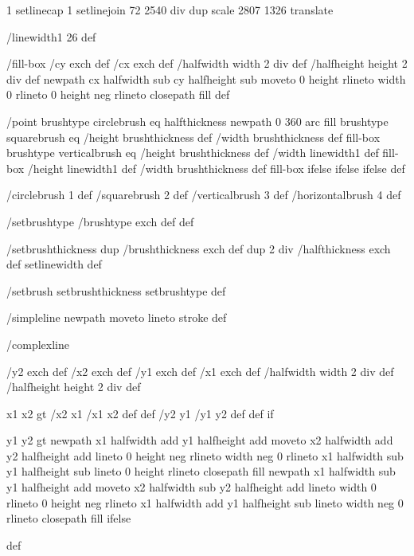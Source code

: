 1 setlinecap 1 setlinejoin
72 2540 div dup scale
2807 1326 translate



/linewidth1 26 def

/fill-box
  { /cy exch def /cx exch def
    /halfwidth width 2 div def
    /halfheight height 2 div def
    newpath
     cx halfwidth sub cy halfheight sub moveto
     0 height rlineto
     width 0 rlineto
     0 height neg rlineto
     closepath
     fill } def

/point
  { brushtype circlebrush eq
     { halfthickness newpath 0 360 arc fill }
     { brushtype squarebrush eq
        { /height brushthickness def
	  /width brushthickness def
	  fill-box }
        { brushtype verticalbrush eq
           { /height brushthickness def
	     /width linewidth1 def
	     fill-box }
           { /height linewidth1 def
	     /width brushthickness def
	     fill-box }
	   ifelse }
        ifelse }
     ifelse } def

/circlebrush     1 def
/squarebrush     2 def
/verticalbrush   3 def
/horizontalbrush 4 def

/setbrushtype { /brushtype exch def } def

/setbrushthickness
  { dup /brushthickness exch def
    dup 2 div /halfthickness exch def
    setlinewidth } def

/setbrush { setbrushthickness setbrushtype } def

/simpleline { newpath moveto lineto stroke } def

/complexline
  { /y2 exch def /x2 exch def
    /y1 exch def /x1 exch def
    /halfwidth width 2 div def
    /halfheight height 2 div def

    x1 x2 gt { /x2 x1 /x1 x2 def def /y2 y1 /y1 y2 def def } if

    y1 y2 gt
     { %
       newpath
        x1 halfwidth add y1 halfheight add moveto
	x2 halfwidth add y2 halfheight add lineto
	0 height neg rlineto
        width neg 0 rlineto
        x1 halfwidth sub y1 halfheight sub lineto
        0 height rlineto
        closepath
	fill }
     { %
       newpath
        x1 halfwidth sub y1 halfheight add moveto
	x2 halfwidth sub y2 halfheight add lineto
	width 0 rlineto
	0 height neg rlineto
	x1 halfwidth add y1 halfheight sub lineto
	width neg 0 rlineto
	closepath
	fill }
     ifelse } def

